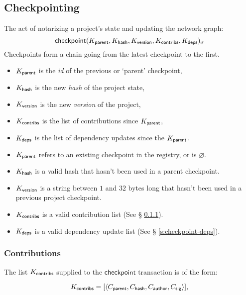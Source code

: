 \subsection{Checkpointing}
\label{s:checkpoint}
The act of notarizing a project's state and updating the network graph:
\[
    \operatorname{\mathsf{checkpoint}}\lparen K_{\mathsf{parent}}, K_{\mathsf{hash}}, K_{\mathsf{version}},
    K_{\mathsf{contribs}}, K_{\mathsf{deps}}\rparen_\sigma
\]
Checkpoints form a chain going from the latest checkpoint to the first.

\begin{itemize}
    \item $K_{\mathsf{parent}}$ is the \emph{id} of the previous or `parent' checkpoint,
    \item $K_{\mathsf{hash}}$ is the new \emph{hash} of the project state,
    \item $K_{\mathsf{version}}$ is the new \emph{version} of the project,
    \item $K_{\mathsf{contribs}}$ is the list of contributions since $K_{\mathsf{parent}}$,
    \item $K_{\mathsf{deps}}$ is the list of dependency updates since the $K_{\mathsf{parent}}$.
\end{itemize}
\validation
\begin{itemize}
    \item{$K_{\mathsf{parent}}$ refers to an existing checkpoint in the registry,
        or is $\varnothing$.}
    \item{$K_{\mathsf{hash}}$ is a valid hash that hasn't been used in a parent
        checkpoint.}
    \item{$K_{\mathsf{version}}$ is a string between $1$ and $32$ bytes long that
        hasn't been used in a previous project checkpoint.}
    \item{$K_{\mathsf{contribs}}$ is a valid contribution list (See \S
        \ref{s:checkpoint-contribs}).}
    \item{$K_{\mathsf{deps}}$ is a valid dependency update list (See \S
        \ref{s:checkpoint-deps}).}
\end{itemize}

\subsubsection{Contributions}
\label{s:checkpoint-contribs}
The list $K_{\mathsf{contribs}}$ supplied to the $\mathsf{checkpoint}$
transaction is of the form:

\[
    K_{\mathsf{contribs}} = [\langle C_{\mathsf{parent}}, C_{\mathsf{hash}},
    C_{\mathsf{author}}, C_{\mathsf{sig}}\rangle],
\]

